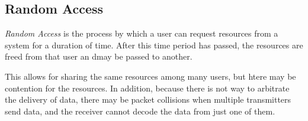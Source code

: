 \subsection{Random Access}\label{subsec:Random_Access}
\begin{definition}\label{def:Random_Access}
  \emph{Random Access} is the process by which a user can request resources from a system for a duration of time.
  After this time period has passed, the resources are freed from that user an dmay be passed to another.

  This allows for sharing the same resources among many users, but htere may be contention for the resources.
  In addition, because there is not way to arbitrate the delivery of data, there may be packet collisions when multiple transmitters send data, and the receiver cannot decode the data from just one of them.
\end{definition}
